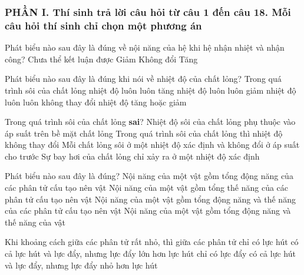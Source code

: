 \subsubsection*{PHẦN I. Thí sinh trả lời câu hỏi từ câu 1 đến câu 18. Mỗi câu hỏi thí sinh chỉ chọn một phương án}
\setcounter{ex}{0}
\begin{ex}%
	Phát biểu nào sau đây là đúng về nội năng của hệ khi hệ nhận nhiệt và nhận công?
	\choice
	{Chưa thể kết luận được}
	{Giảm}
	{Không đổi}
	{\True Tăng}
\end{ex}

\begin{ex}%
		Phát biểu nào sau đây là đúng khi nói về nhiệt độ của chất lỏng? Trong quá trình sôi của chất lỏng 
	\choice
	{nhiệt độ luôn luôn tăng}
	{nhiệt độ luôn luôn giảm}
	{\True nhiệt độ luôn luôn không thay đổi}
	{nhiệt độ tăng hoặc giảm}
	\loigiai{
		
	}
\end{ex}

\begin{ex}%
Trong quá trình sôi của chất lỏng \textbf{sai}?
	\choice
	{Nhiệt độ sôi của chất lỏng phụ thuộc vào áp suất trên bề mặt chất lỏng}
	{Trong quá trình sôi của chất lỏng thì nhiệt độ không thay đổi}
	{Mỗi chất lỏng sôi ở một nhiệt độ xác định và không đổi ở áp suất cho trước}
	{\True Sự bay hơi của chất lỏng chỉ xảy ra ở một nhiệt độ xác định}
	\loigiai{
		
	}
\end{ex}

\begin{ex}%
	Phát biểu nào sau đây là đúng?
	\choice
	{Nội năng của một vật gồm tổng động năng của các phân tử cấu tạo nên vật}
	{Nội năng của một vật gồm tổng thế năng của các phân tử cấu tạo nên vật}
	{\True Nội năng của một vật gồm tổng động năng và thế năng của các phân tử cấu tạo nên vật}
	{Nội năng của một vật gồm tổng động năng và thế năng của vật}
	\loigiai{
		
	}
\end{ex}

\begin{ex}%
	Khi khoảng cách giữa các phân tử rất nhỏ, thì giữa các phân tử
	\choice
	{chỉ có lực hút}
	{\True có cả lực hút và lực đẩy, nhưng lực đẩy lớn hơn lực hút}
	{chỉ có lực đẩy}
	{có cả lực hút và lực đẩy, nhưng lực đẩy nhỏ hơn lực hút}
	\loigiai{
		
	}
\end{ex}

